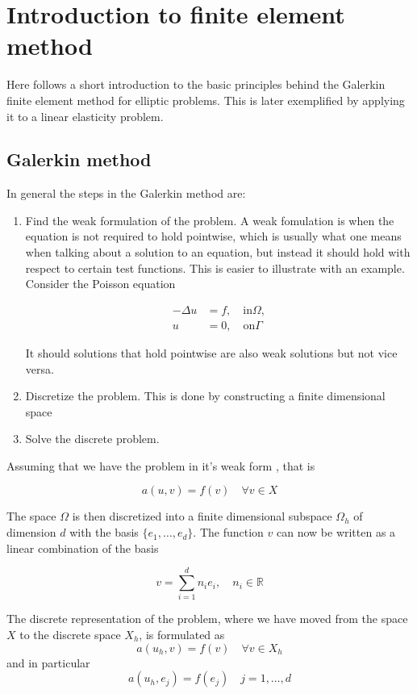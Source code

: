 \documentclass[fem.tex]{subfiles}
\begin{document}
\chapter{Introduction to finite element method}

Here follows a short introduction to the basic principles behind the Galerkin finite element method for elliptic problems. This is later exemplified by applying it to a linear elasticity problem. 



\section{Galerkin method}
\label{sec:galerkin}

In general the steps in the Galerkin method are:
\begin{enumerate}
\item Find the weak formulation of the problem. A weak fomulation is when the equation is not required to hold pointwise, which is usually what one means when talking about a solution to an equation, but instead it should hold with respect to certain test functions. This is easier to illustrate with an example. Consider the Poisson equation


\begin{align}
-\Delta u & = f, \quad \text{in} \Omega, \\
u & = 0, \quad  \text{on} \Gamma
\end{align}

 It should solutions that hold pointwise are also weak solutions but not vice versa. 
\item Discretize the problem. This is done by constructing a finite dimensional space 
\item Solve the discrete problem.
\end{enumerate}
Assuming that we have the problem in it's weak form , that is 

\[  a(u,v) = f(v) \quad \forall v \in X \]

The space $\Omega$ is then discretized into a finite dimensional subspace $\Omega_h$ of dimension $d$ with the basis $\{e_1, \ldots, e_d\}$. The function $v$ can now be written as a linear combination of the basis

\[ v = \sum_{i=1}^d n_i e_i, \quad n_i \in \mathbb{R} \]

The discrete representation of the problem, where we have moved from the space $X$ to the discrete space $X_h$, is formulated as
%
\begin{equation} 
    a(u_h, v) = f(v) \quad \forall v \in X_h
    \label{eqn:disc_prob}
\end{equation}
%
and in particular
\begin{equation} 
    a(u_h, e_j) = f(e_j) \quad j = 1, \ldots, d
    \label{eqn:disc_part}
\end{equation}
\end{document}

